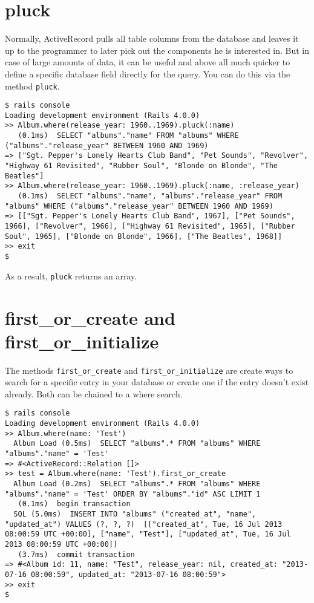 \documentclass[a4paper]{book}
\newcounter{tab}[chapter]
\begin{document}
\section{pluck}\label{pluck}

Normally, ActiveRecord pulls all table columns from the database and leaves it up to the programmer to later pick out the components he is interested in. But in case of large amounts of data, it can be useful and above all much quicker to define a specific database field directly for the query. You can do this via the method \texttt{pluck}.

\begin{shaded}\begin{verbatim}
$ rails console
Loading development environment (Rails 4.0.0)
>> Album.where(release_year: 1960..1969).pluck(:name)
   (0.1ms)  SELECT "albums"."name" FROM "albums" WHERE ("albums"."release_year" BETWEEN 1960 AND 1969)
=> ["Sgt. Pepper's Lonely Hearts Club Band", "Pet Sounds", "Revolver", "Highway 61 Revisited", "Rubber Soul", "Blonde on Blonde", "The Beatles"]
>> Album.where(release_year: 1960..1969).pluck(:name, :release_year)
   (0.1ms)  SELECT "albums"."name", "albums"."release_year" FROM "albums" WHERE ("albums"."release_year" BETWEEN 1960 AND 1969)
=> [["Sgt. Pepper's Lonely Hearts Club Band", 1967], ["Pet Sounds", 1966], ["Revolver", 1966], ["Highway 61 Revisited", 1965], ["Rubber Soul", 1965], ["Blonde on Blonde", 1966], ["The Beatles", 1968]]
>> exit
$
\end{verbatim}\end{shaded}

As a result, \texttt{pluck} returns an array.

\section{first\_or\_create and first\_or\_initialize}\label{firstux5forux5fcreate-and-firstux5forux5finitialize}

The methods \texttt{first\_or\_create} and \texttt{first\_or\_initialize} are create ways to search for a specific entry in your database or create one if the entry doesn't exist already. Both can be chained to a where search.

\begin{shaded}\begin{verbatim}
$ rails console
Loading development environment (Rails 4.0.0)
>> Album.where(name: 'Test')
  Album Load (0.5ms)  SELECT "albums".* FROM "albums" WHERE "albums"."name" = 'Test'
=> #<ActiveRecord::Relation []>
>> test = Album.where(name: 'Test').first_or_create
  Album Load (0.2ms)  SELECT "albums".* FROM "albums" WHERE "albums"."name" = 'Test' ORDER BY "albums"."id" ASC LIMIT 1
   (0.1ms)  begin transaction
  SQL (5.0ms)  INSERT INTO "albums" ("created_at", "name", "updated_at") VALUES (?, ?, ?)  [["created_at", Tue, 16 Jul 2013 08:00:59 UTC +00:00], ["name", "Test"], ["updated_at", Tue, 16 Jul 2013 08:00:59 UTC +00:00]]
   (3.7ms)  commit transaction
=> #<Album id: 11, name: "Test", release_year: nil, created_at: "2013-07-16 08:00:59", updated_at: "2013-07-16 08:00:59">
>> exit
$
\end{verbatim}\end{shaded}
\end{document}
